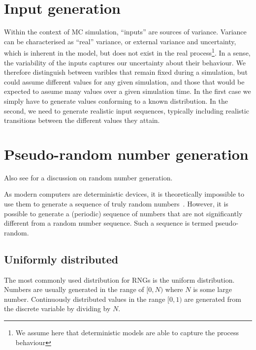 \section{Input generation}
Within the context of MC simulation, ``inputs'' are sources of variance.
Variance can be characterised as ``real'' variance, or external variance and uncertainty, which is inherent in the model, but does not exist in the real process\footnote{We assume here that deterministic models are able to capture the
process behaviour}.
In a sense, the variability of the inputs captures our uncertainty about their behaviour.
We therefore distinguish between varibles that remain fixed during a simulation, but could assume different values for any given simulation, and those that would be expected to assume many values over a given simulation time.
In the first case we simply have to generate values conforming to a known distribution.
In the second, we need to generate realistic input sequences, typically including realistic transitions between the different values they attain.


\section{Pseudo-random number generation}

Also see \citet[183]{giordano.fox.ea2009first} for a discussion on random number generation.

As modern computers are deterministic devices, it is theoretically impossible to use them to generate a sequence of truly random numbers~\citep{neumann1951various}.
However, it is possible to generate a (periodic) sequence of numbers that are not significantly different from a random number sequence.
Such a sequence is termed pseudo-random.


\subsection{Uniformly distributed}
The most commonly used distribution for RNGs is the uniform distribution.
Numbers are usually generated in the range of $[0, N)$ where $N$ is some large number.
Continuously distributed values in the range $[0,1)$ are generated from the discrete variable by dividing by $N$.

